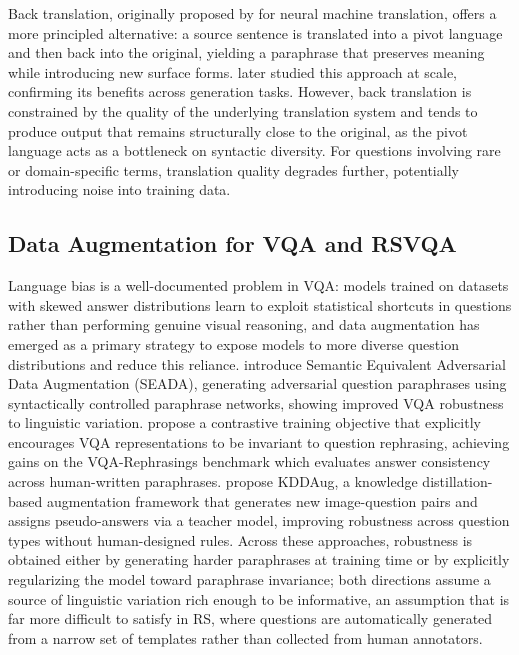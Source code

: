 Back translation, originally proposed by
\cite{sennrich2016backtranslation} for neural machine
translation, offers a more principled alternative: a
source sentence is translated into a pivot language and
then back into the original, yielding a paraphrase that
preserves meaning while introducing new surface forms.
\textcite{edunov2018backtranslation} later studied this
approach at scale, confirming its benefits across
generation tasks. However, back translation is
constrained by the quality of the underlying translation
system and tends to produce output that remains
structurally close to the original, as the pivot language
acts as a bottleneck on syntactic diversity. For questions
involving rare or domain-specific terms, translation
quality degrades further, potentially introducing noise
into training data.
 
\subsection{Data Augmentation for VQA and RSVQA}
\label{sec:chap3_rw_vqa}
 
Language bias is a well-documented problem in VQA: models
trained on datasets with skewed answer distributions
learn to exploit statistical shortcuts in questions rather
than performing genuine visual reasoning, and data
augmentation has emerged as a primary strategy to expose
models to more diverse question distributions and reduce
this reliance.
\textcite{gokhale2020seada} introduce Semantic Equivalent
Adversarial Data Augmentation (SEADA), generating
adversarial question paraphrases using syntactically
controlled paraphrase networks, showing improved VQA
robustness to linguistic variation.
\textcite{sheng2021contrastclassify} propose a contrastive
training objective that explicitly encourages VQA
representations to be invariant to question rephrasing,
achieving gains on the VQA-Rephrasings benchmark which
evaluates answer consistency across human-written
paraphrases. \textcite{chen2022rethinkingDA} propose KDDAug,
a knowledge distillation-based augmentation framework
that generates new image-question pairs and assigns
pseudo-answers via a teacher model, improving robustness
across question types without human-designed rules. Across these approaches, robustness is obtained either by
generating harder paraphrases at training time or by
explicitly regularizing the model toward paraphrase
invariance; both directions assume a source of linguistic
variation rich enough to be informative, an assumption
that is far more difficult to satisfy in RS, where questions
are automatically generated from a narrow set of templates
rather than collected from human annotators.
 
